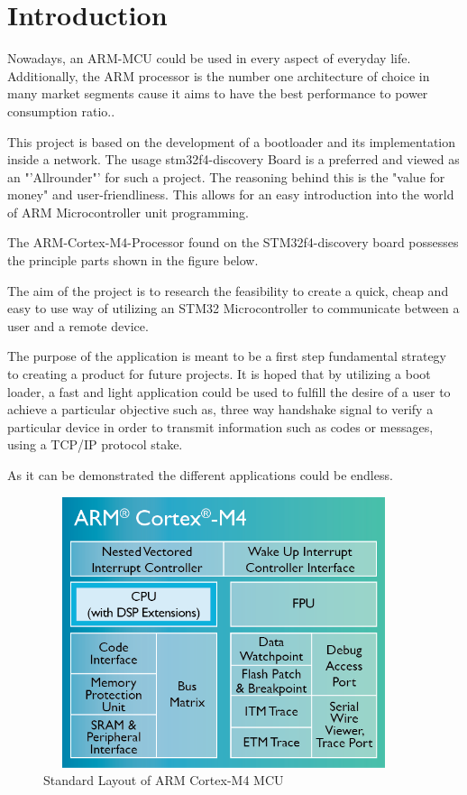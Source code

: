 \chapter{Introduction}

\glsaddall

Nowadays, an ARM-MCU could be used in every aspect of everyday life.
Additionally, the ARM processor is the number one architecture of choice in
many market segments cause it aims to have the best performance to power consumption ratio..

This project is based on the development of a bootloader and its implementation
inside a network. The usage stm32f4-discovery Board is a preferred and viewed as an
"'Allrounder"' for such a project. The reasoning behind this is the "value for money"
and user-friendliness. This allows for an easy introduction into the world of ARM
Microcontroller unit programming.\citep{ST-15}

The ARM-Cortex-M4-Processor found on the STM32f4-discovery board possesses
the principle parts shown in the figure below.

The aim of the project is to research the feasibility to create a quick, cheap
and easy to use way of utilizing an STM32 Microcontroller to communicate between
a user and a remote device.\citep{ARM-14}

The purpose of the application is meant to be a first step fundamental strategy to
creating a product for future projects.
It is hoped that by utilizing a boot loader, a fast and light application could
be used to fulfill the desire of a user to achieve a particular objective such
as, three way handshake signal to verify a particular device in order to transmit
information such as codes or messages, using a TCP/IP protocol stake.

As it can be demonstrated the different applications could be endless.

\begin{figure}[ht]
	\centering
	\includegraphics[width=400px, height=300px]{../img/Cortex-M4-chip-diagram-LG.png}
	\caption{Standard Layout of ARM Cortex-M4 MCU}
	\label{m4_prinzip}
\end{figure}

